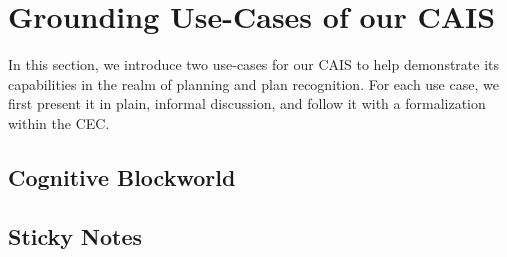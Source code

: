 \chapter{Grounding Use-Cases of our CAIS}

In this section, we introduce two use-cases for our CAIS to help demonstrate
its capabilities in the realm of planning and plan recognition. For each
use case, we first present it in plain, informal discussion, and follow it
with a formalization within the CEC.

\section{Cognitive Blockworld}



\section{Sticky Notes}


